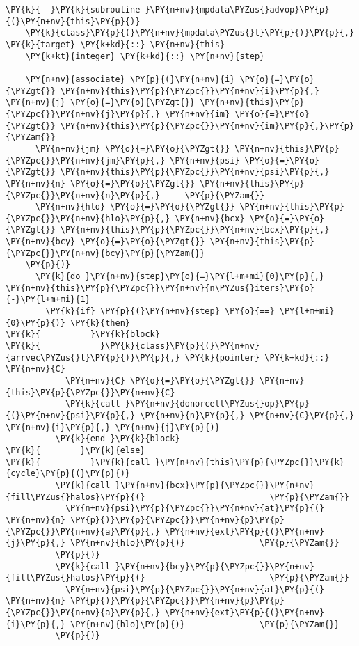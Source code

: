 \begin{Verbatim}[commandchars=\\\{\}]
\PY{k}{  }\PY{k}{subroutine }\PY{n+nv}{mpdata\PYZus{}advop}\PY{p}{(}\PY{n+nv}{this}\PY{p}{)}
    \PY{k}{class}\PY{p}{(}\PY{n+nv}{mpdata\PYZus{}t}\PY{p}{)}\PY{p}{,} \PY{k}{target} \PY{k+kd}{::} \PY{n+nv}{this}
    \PY{k+kt}{integer} \PY{k+kd}{::} \PY{n+nv}{step}

    \PY{n+nv}{associate} \PY{p}{(}\PY{n+nv}{i} \PY{o}{=}\PY{o}{\PYZgt{}} \PY{n+nv}{this}\PY{p}{\PYZpc{}}\PY{n+nv}{i}\PY{p}{,} \PY{n+nv}{j} \PY{o}{=}\PY{o}{\PYZgt{}} \PY{n+nv}{this}\PY{p}{\PYZpc{}}\PY{n+nv}{j}\PY{p}{,} \PY{n+nv}{im} \PY{o}{=}\PY{o}{\PYZgt{}} \PY{n+nv}{this}\PY{p}{\PYZpc{}}\PY{n+nv}{im}\PY{p}{,}\PY{p}{\PYZam{}}
      \PY{n+nv}{jm} \PY{o}{=}\PY{o}{\PYZgt{}} \PY{n+nv}{this}\PY{p}{\PYZpc{}}\PY{n+nv}{jm}\PY{p}{,} \PY{n+nv}{psi} \PY{o}{=}\PY{o}{\PYZgt{}} \PY{n+nv}{this}\PY{p}{\PYZpc{}}\PY{n+nv}{psi}\PY{p}{,} \PY{n+nv}{n} \PY{o}{=}\PY{o}{\PYZgt{}} \PY{n+nv}{this}\PY{p}{\PYZpc{}}\PY{n+nv}{n}\PY{p}{,}     \PY{p}{\PYZam{}}
      \PY{n+nv}{hlo} \PY{o}{=}\PY{o}{\PYZgt{}} \PY{n+nv}{this}\PY{p}{\PYZpc{}}\PY{n+nv}{hlo}\PY{p}{,} \PY{n+nv}{bcx} \PY{o}{=}\PY{o}{\PYZgt{}} \PY{n+nv}{this}\PY{p}{\PYZpc{}}\PY{n+nv}{bcx}\PY{p}{,} \PY{n+nv}{bcy} \PY{o}{=}\PY{o}{\PYZgt{}} \PY{n+nv}{this}\PY{p}{\PYZpc{}}\PY{n+nv}{bcy}\PY{p}{\PYZam{}}
    \PY{p}{)}
      \PY{k}{do }\PY{n+nv}{step}\PY{o}{=}\PY{l+m+mi}{0}\PY{p}{,} \PY{n+nv}{this}\PY{p}{\PYZpc{}}\PY{n+nv}{n\PYZus{}iters}\PY{o}{-}\PY{l+m+mi}{1}
        \PY{k}{if} \PY{p}{(}\PY{n+nv}{step} \PY{o}{==} \PY{l+m+mi}{0}\PY{p}{)} \PY{k}{then}
\PY{k}{          }\PY{k}{block}
\PY{k}{            }\PY{k}{class}\PY{p}{(}\PY{n+nv}{arrvec\PYZus{}t}\PY{p}{)}\PY{p}{,} \PY{k}{pointer} \PY{k+kd}{::} \PY{n+nv}{C}
            \PY{n+nv}{C} \PY{o}{=}\PY{o}{\PYZgt{}} \PY{n+nv}{this}\PY{p}{\PYZpc{}}\PY{n+nv}{C}
            \PY{k}{call }\PY{n+nv}{donorcell\PYZus{}op}\PY{p}{(}\PY{n+nv}{psi}\PY{p}{,} \PY{n+nv}{n}\PY{p}{,} \PY{n+nv}{C}\PY{p}{,} \PY{n+nv}{i}\PY{p}{,} \PY{n+nv}{j}\PY{p}{)}
          \PY{k}{end }\PY{k}{block}
\PY{k}{        }\PY{k}{else}
\PY{k}{          }\PY{k}{call }\PY{n+nv}{this}\PY{p}{\PYZpc{}}\PY{k}{cycle}\PY{p}{(}\PY{p}{)}
          \PY{k}{call }\PY{n+nv}{bcx}\PY{p}{\PYZpc{}}\PY{n+nv}{fill\PYZus{}halos}\PY{p}{(}                         \PY{p}{\PYZam{}}
            \PY{n+nv}{psi}\PY{p}{\PYZpc{}}\PY{n+nv}{at}\PY{p}{(} \PY{n+nv}{n} \PY{p}{)}\PY{p}{\PYZpc{}}\PY{n+nv}{p}\PY{p}{\PYZpc{}}\PY{n+nv}{a}\PY{p}{,} \PY{n+nv}{ext}\PY{p}{(}\PY{n+nv}{j}\PY{p}{,} \PY{n+nv}{hlo}\PY{p}{)}               \PY{p}{\PYZam{}}
          \PY{p}{)}
          \PY{k}{call }\PY{n+nv}{bcy}\PY{p}{\PYZpc{}}\PY{n+nv}{fill\PYZus{}halos}\PY{p}{(}                         \PY{p}{\PYZam{}}
            \PY{n+nv}{psi}\PY{p}{\PYZpc{}}\PY{n+nv}{at}\PY{p}{(} \PY{n+nv}{n} \PY{p}{)}\PY{p}{\PYZpc{}}\PY{n+nv}{p}\PY{p}{\PYZpc{}}\PY{n+nv}{a}\PY{p}{,} \PY{n+nv}{ext}\PY{p}{(}\PY{n+nv}{i}\PY{p}{,} \PY{n+nv}{hlo}\PY{p}{)}               \PY{p}{\PYZam{}}
          \PY{p}{)}


\end{Verbatim}
